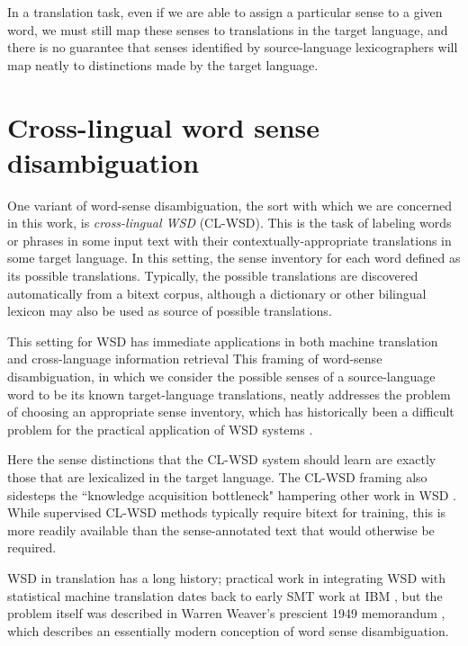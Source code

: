 In a translation task, even if we are able to assign a particular sense to a
given word, we must still map these senses to translations in the target
language, and there is no guarantee that senses identified by source-language
lexicographers will map neatly to distinctions made by the target language.




\section{Cross-lingual word sense disambiguation}
\label{sec:clwsd}

One variant of word-sense disambiguation, the sort with which we are concerned
in this work, is \emph{cross-lingual WSD} (CL-WSD). This is the task of
labeling words or phrases in some input text with their
contextually-appropriate translations in some target language.
In this setting, the sense inventory for each word defined as its possible
translations. Typically, the possible translations are discovered automatically
from a bitext corpus, although a dictionary or other bilingual lexicon may also
be used as source of possible translations.

This setting for WSD has immediate applications in both machine translation and
cross-language information retrieval
This framing of word-sense disambiguation, in which we consider the possible
senses of a source-language word to be its known target-language translations,
neatly addresses the problem of choosing an appropriate sense inventory, which
has historically been a difficult problem for the practical application of WSD
systems \cite{agirre2006word}.

Here the sense distinctions that the CL-WSD system should learn are exactly
those that are lexicalized in the target language.
The CL-WSD framing also sidesteps the ``knowledge acquisition bottleneck"
hampering other work in WSD \cite{lefever-hoste-decock:2011:ACL-HLT2011}.
While supervised CL-WSD methods typically require bitext for training, this is
more readily available than the sense-annotated text that would otherwise be
required.


WSD in translation has a long history; practical work in integrating
WSD with statistical machine translation dates back to early SMT work at IBM
\cite{Brown91word-sensedisambiguation}, but the problem itself was described in
Warren Weaver's prescient 1949 memorandum \cite{weavermemo}, which describes an
essentially modern conception of word sense disambiguation.


